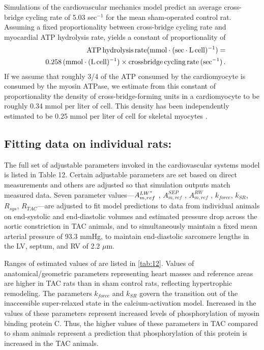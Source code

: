\documentclass[fleqn,10pt]{physiome}
\begin{document}
Simulations of the cardiovascular mechanics model predict an average cross-bridge cycling rate of 5.03 sec$^{-1}$ for the mean sham-operated control rat. Assuming a fixed proportionality between cross-bridge cycling rate and myocardial ATP hydrolysis rate, yields a constant of proportionality of 
\begin{eqnarray}
 & & {\rm ATP\, hydrolysis\, rate (mmol\cdot(sec \cdot L \, cell)^{-1})}  = \nonumber \\
 & & {\rm 0.258 \, (mmol \cdot (L \, cell)^{-1}) \times crossbridge \, cycling \,rate \, (sec^{-1}) } \, .
\end{eqnarray}
If we assume that roughly 3/4 of the ATP consumed by the cardiomyocyte is consumed by the myosin ATPase, we estimate from this constant of proportionality the density of cross-bridge-forming units in a cardiomyocyte to be roughly 0.34 mmol per liter of cell. This density has been independently estimated to be 0.25 mmol per liter of cell for skeletal myocytes \citep{Barclay2010}.

\subsection{Fitting data on individual rats:}

The full set of adjustable parameters invoked in the cardiovascular systems model is listed in Table 12. Certain adjustable parameters are set based on direct measurements and others are adjusted so that simulation outputs match measured data. Seven parameter values---$A_{m,ref}^{LW"}$ , $A_{m,ref} ^{SEP}$ , $A_{m,ref}^{RW}$ , $k_{force}$, $k_{SR}$, $R_{sys}$, $R_{TAC}$---are adjusted to fit model predictions to data from individual animals on end-systolic and end-diastolic volumes and estimated pressure drop across the aortic constriction in TAC animals, and to simultaneously maintain a fixed mean arterial pressure of 93.3 mmHg, to maintain end-diastolic sarcomere lengths in the LV, septum, and RV of 2.2 $\mu$m. 

Ranges of estimated values of are listed in \autoref{tab:12}. Values of anatomical/geometric parameters representing heart masses and reference areas are higher in TAC rats than in sham control rats, reflecting hypertrophic remodeling.
The parameters $k_{force}$ and $k_{SR}$ govern the transition out of the inaccessible super-relaxed state in the calcium-activation model. Increased in the values of these parameters represent increased levels of phosphorylation of myosin binding protein C. Thus, the higher values of these parameters in TAC compared to sham animals represent a prediction that phosphorylation of this protein is increased in the TAC animals.
\end{document}
